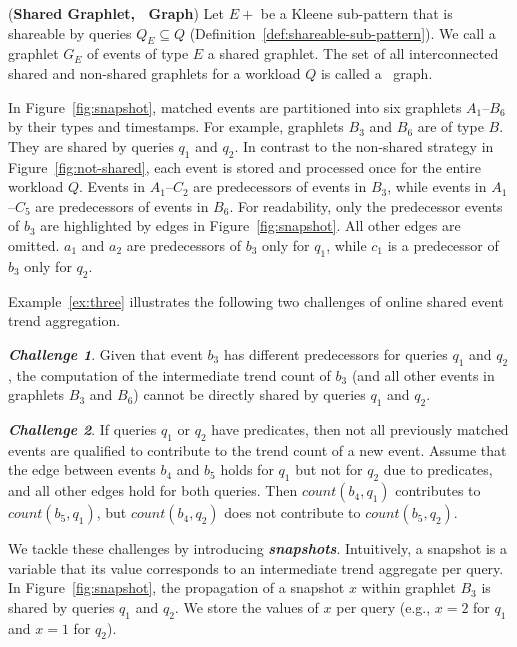 \begin{definition}(\textbf{Shared Graphlet, \app\ Graph})
%
Let $E+$ be a Kleene sub-pattern that is shareable by queries $Q_E \subseteq Q$ (Definition~\ref{def:shareable-sub-pattern}). 
We call a graphlet $G_E$ of events of type $E$ a shared graphlet. 
The set of all interconnected shared and non-shared graphlets for a workload $Q$ is called a \app\ graph.
%
\label{def:shared-graphlet}
\end{definition}

\begin{example}
In Figure~\ref{fig:snapshot}, matched events are partitioned into six graphlets $A_1$--$B_6$ by their types and timestamps. For example, graphlets $B_3$ and $B_6$ are of type $B$. They are shared by queries $q_1$ and $q_2$.
In contrast to the non-shared strategy in Figure~\ref{fig:not-shared}, each event is stored and processed once for the entire workload $Q$. 
Events in $A_1$--$C_2$ are predecessors of events in $B_3$, while events in $A_1$--$C_5$ are predecessors of events in $B_6$. 
For readability, only the predecessor events of $b_3$ are highlighted by edges in Figure~\ref{fig:snapshot}. All other edges are omitted. 
$a_1$ and $a_2$ are predecessors of $b_3$ only for $q_1$, while $c_1$ is a predecessor of $b_3$ only for $q_2$. 
\label{ex:three}
\end{example}

Example~\ref{ex:three} illustrates the following two challenges of online shared event trend aggregation.

\textit{\textbf{Challenge 1}}. 
Given that event $b_3$ has different predecessors for queries $q_1$ and $q_2$, the computation of the intermediate trend count of $b_3$ (and all other events in graphlets $B_3$ and $B_6$) cannot be directly shared by queries $q_1$ and $q_2$.

\textit{\textbf{Challenge 2}}. 
If queries $q_1$ or $q_2$ have predicates, then not all previously matched events are qualified to contribute to the trend count of a new event. Assume that the edge between events $b_4$ and $b_5$ holds for $q_1$ but not for $q_2$ due to predicates, and all other edges hold for both queries. Then $count(b_4,q_1)$ contributes to $count(b_5,q_1)$, but $count(b_4,q_2)$ does not contribute to $count(b_5,q_2)$.

We tackle these challenges by introducing \textbf{\textit{snapshots}}.
Intuitively, a snapshot is a variable that its value corresponds to an intermediate trend aggregate per query. 
In Figure~\ref{fig:snapshot}, the propagation of a snapshot $x$ within graphlet $B_3$ is shared by queries $q_1$ and $q_2$. 
We store the values of $x$ per query (e.g., $x=2$ for $q_1$ and $x=1$ for $q_2$).

